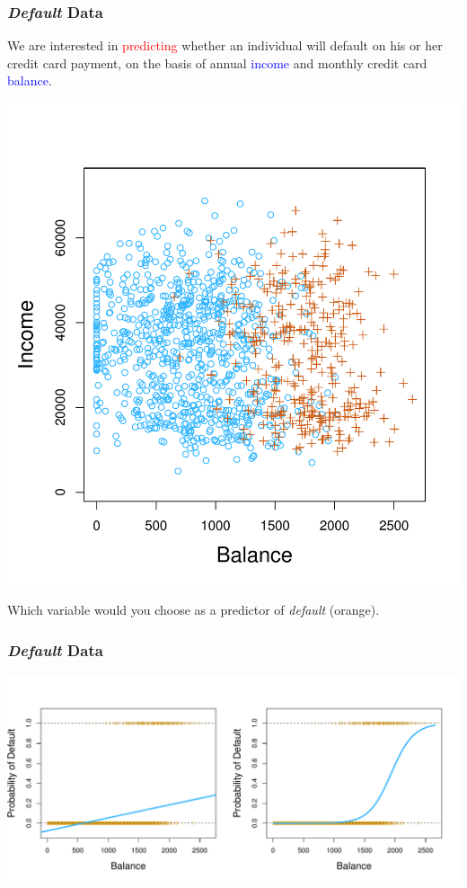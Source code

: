 \documentclass{beamer}
\begin{document}
\frame
{\frametitle{{\it Default} Data}

We are interested in \textcolor{red}{predicting} whether an individual will default on his or her credit card payment, on the basis of annual \textcolor{blue}{income} and monthly credit card \textcolor{blue}{balance}.

\begin{center}
\includegraphics[scale=0.25]{figures/default}
\end{center}
\pause Which variable would you choose as a predictor of \textit{default} (orange).

}
\frame
{\frametitle{{\it Default} Data}


\begin{center}
\includegraphics[scale=0.50]{figures/logistic}
\end{center}

}
\end{document}
